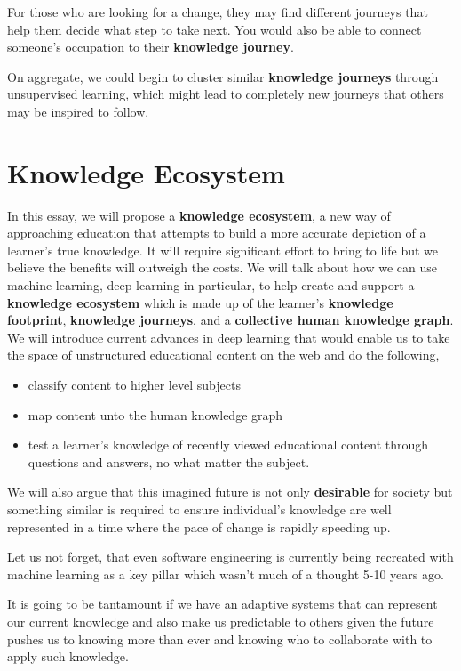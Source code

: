 \documentclass{acm_proc_article-sp}
\begin{document}
For those who are looking for a change, they may find different journeys
that help them decide what step to take next. You would also be able to
connect someone's occupation to their \textbf{knowledge journey}.

On aggregate, we could begin to cluster similar \textbf{knowledge
journeys} through unsupervised learning, which might lead to completely
new journeys that others may be inspired to follow.

\section{Knowledge Ecosystem}\label{knowledge-ecosystem}

In this essay, we will propose a \textbf{knowledge ecosystem}, a new way
of approaching education that attempts to build a more accurate
depiction of a learner's true knowledge. It will require significant
effort to bring to life but we believe the benefits will outweigh the
costs. We will talk about how we can use machine learning, deep learning
in particular, to help create and support a \textbf{knowledge ecosystem}
which is made up of the learner's \textbf{knowledge footprint},
\textbf{knowledge journeys}, and a \textbf{collective human knowledge
graph}. We will introduce current advances in deep learning that would
enable us to take the space of unstructured educational content on the
web and do the following,

\begin{itemize}
\item
  classify content to higher level subjects
\item
  map content unto the human knowledge graph
\item
  test a learner's knowledge of recently viewed educational content
  through questions and answers, no what matter the subject.
\end{itemize}

We will also argue that this imagined future is not only
\textbf{desirable} for society but something similar is required to
ensure individual's knowledge are well represented in a time where the
pace of change is rapidly speeding up.

Let us not forget, that even software engineering is currently being
recreated with machine learning as a key pillar which wasn't much of a
thought 5-10 years ago.

It is going to be tantamount if we have an adaptive systems that can
represent our current knowledge and also make us predictable to others
given the future pushes us to knowing more than ever and knowing who to
collaborate with to apply such knowledge.
\end{document}
